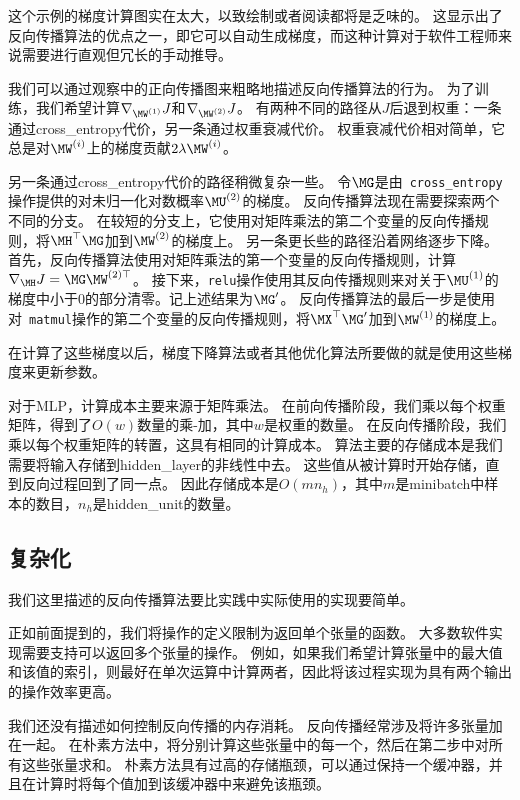 这个示例的梯度计算图实在太大，以致绘制或者阅读都将是乏味的。
这显示出了反向传播算法的优点之一，即它可以自动生成梯度，而这种计算对于软件工程师来说需要进行直观但冗长的手动推导。

我们可以通过观察中的正向传播图来粗略地描述反向传播算法的行为。
为了训练，我们希望计算$\nabla_{\MW^{(1)}} J$和$\nabla_{\MW^{(2)}} J$。
有两种不同的路径从$J$后退到权重：一条通过\gls{cross_entropy}代价，另一条通过权重衰减代价。
权重衰减代价相对简单，它总是对$\MW^{(i)}$上的梯度贡献$2\lambda \MW^{(i)}$。
  
  
另一条通过\gls{cross_entropy}代价的路径稍微复杂一些。
令$\MG$是由~\verb|cross_entropy|操作提供的对未归一化对数概率$\MU^{(2)}$的梯度。
反向传播算法现在需要探索两个不同的分支。
在较短的分支上，它使用对矩阵乘法的第二个变量的反向传播规则，将$\MH^\top \MG$加到$\MW^{(2)}$的梯度上。
另一条更长些的路径沿着网络逐步下降。
首先，反向传播算法使用对矩阵乘法的第一个变量的反向传播规则，计算$\nabla_{\MH} J = \MG\MW^{(2)\top}$。
接下来，\verb|relu|操作使用其反向传播规则来对关于$\MU^{(1)}$的梯度中小于0的部分清零。记上述结果为$\MG'$。 
反向传播算法的最后一步是使用对~\verb|matmul|操作的第二个变量的反向传播规则，将$\MX^\top \MG'$加到$\MW^{(1)}$的梯度上。

在计算了这些梯度以后，梯度下降算法或者其他优化算法所要做的就是使用这些梯度来更新参数。

对于MLP，计算成本主要来源于矩阵乘法。
在前向传播阶段，我们乘以每个权重矩阵，得到了$O(w)$数量的乘-加，其中$w$是权重的数量。
在反向传播阶段，我们乘以每个权重矩阵的转置，这具有相同的计算成本。
算法主要的存储成本是我们需要将输入存储到\gls{hidden_layer}的非线性中去。
这些值从被计算时开始存储，直到反向过程回到了同一点。
因此存储成本是$O(mn_h)$，其中$m$是\gls{minibatch}中样本的数目，$n_h$是\gls{hidden_unit}的数量。
  
  
\subsection{复杂化}
\label{sec:complications}

我们这里描述的反向传播算法要比实践中实际使用的实现要简单。

正如前面提到的，我们将操作的定义限制为返回单个张量的函数。
大多数软件实现需要支持可以返回多个张量的操作。 
例如，如果我们希望计算张量中的最大值和该值的索引，则最好在单次运算中计算两者，因此将该过程实现为具有两个输出的操作效率更高。

我们还没有描述如何控制反向传播的内存消耗。
反向传播经常涉及将许多张量加在一起。
在朴素方法中，将分别计算这些张量中的每一个，然后在第二步中对所有这些张量求和。 
朴素方法具有过高的存储瓶颈，可以通过保持一个缓冲器，并且在计算时将每个值加到该缓冲器中来避免该瓶颈。

